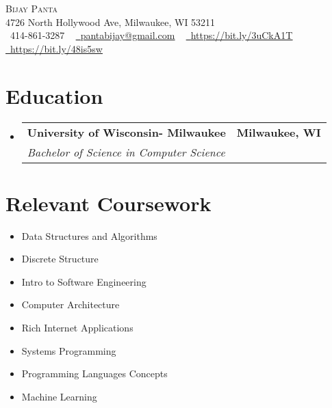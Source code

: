 \documentclass[letterpaper,11pt]{article}
\makeatletter
\newcommand{\resumeSubheading}[4]{
  \vspace{-2pt}\item
    \begin{tabular*}{1.0\textwidth}[t]{l@{\extracolsep{\fill}}r}
      \textbf{#1} & \textbf{\small #2} \\
      \textit{\small#3} & \textit{\small #4} \\
    \end{tabular*}\vspace{-7pt}
}
\newcommand{\resumeSubHeadingListStart}{\begin{itemize}[leftmargin=0.0in, label={}]}
\newcommand{\resumeSubHeadingListEnd}{\end{itemize}}
\makeatother
\begin{document}

\begin{center}
    {\Huge \scshape Bijay Panta} \\ \vspace{1pt}
    4726 North Hollywood Ave, Milwaukee, WI 53211 \\ \vspace{1pt}
    \small \raisebox{-0.1\height}\faPhone\ 414-861-3287 ~ \href{mailto:x@gmail.com}{\raisebox{-0.2\height}\faEnvelope\  \underline{pantabijay@gmail.com}} ~ 
    \href{https://bit.ly/3uCkA1T}{\raisebox{-0.2\height}\faLinkedin\ \underline{https://bit.ly/3uCkA1T}}  ~
    \href{https://bit.ly/48is5sw}{\raisebox{-0.2\height}\faGithub\ \underline{https://bit.ly/48is5sw}}
    \vspace{-8pt}
\end{center}


\section{Education}
  \resumeSubHeadingListStart
    \resumeSubheading
      {University of Wisconsin- Milwaukee}{Milwaukee, WI}
      {Bachelor of Science in Computer Science}{}
  \resumeSubHeadingListEnd

\section{Relevant Coursework}
        \begin{multicols}{4}
            \begin{itemize}[itemsep=-2pt, parsep=3pt]
                \item\small Data Structures and Algorithms
                \item Discrete Structure
                \item Intro to Software Engineering
                \item Computer Architecture
                \item Rich Internet Applications
                \item Systems Programming
                \item Programming Languages Concepts
                \item Machine Learning
            \end{itemize}
        \end{multicols}
        \vspace*{2.0\multicolsep}
\end{document}
